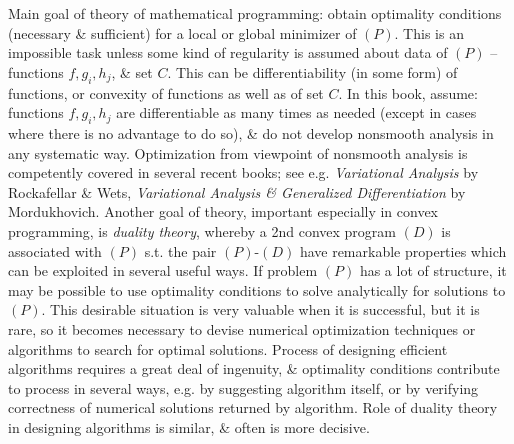\documentclass{article}
\begin{document}
\begin{itemize}
    Main goal of theory of mathematical programming: obtain optimality conditions (necessary \& sufficient) for a local or global minimizer of $(P)$. This is an impossible task unless some kind of regularity is assumed about data of $(P)$ -- functions $f,g_i,h_j$, \& set $C$. This can be differentiability (in some form) of functions, or convexity of functions as well as of set $C$. In this book, assume: functions $f,g_i,h_j$ are differentiable as many times as needed (except in cases where there is no advantage to do so), \& do not develop nonsmooth analysis in any systematic way. Optimization from viewpoint of nonsmooth analysis is competently covered in several recent books; see e.g. {\it Variational Analysis} by {\sc Rockafellar \& Wets}, {\it Variational Analysis \& Generalized Differentiation} by {\sc Mordukhovich}. Another goal of theory, important especially in convex programming, is {\it duality theory}, whereby a 2nd convex program $(D)$ is associated with $(P)$ s.t. the pair $(P)$-$(D)$ have remarkable properties which can be exploited in several useful ways. If problem $(P)$ has a lot of structure, it may be possible to use optimality conditions to solve analytically for solutions to $(P)$. This desirable situation is very valuable when it is successful, but it is rare, so it becomes necessary to devise numerical optimization techniques or algorithms to search for optimal solutions. Process of designing efficient algorithms requires a great deal of ingenuity, \& optimality conditions contribute to process in several ways, e.g. by suggesting algorithm itself, or by verifying correctness of numerical solutions returned by algorithm. Role of duality theory in designing algorithms is similar, \& often is more decisive.


\end{itemize}
\end{document}
